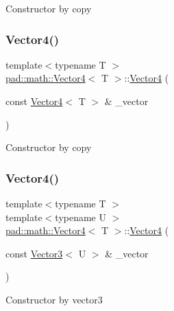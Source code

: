 Constructor by copy \mbox{\label{structpad_1_1math_1_1_vector4_a44585061b6980544187b6309a3371061}} 
\subsubsection{\texorpdfstring{Vector4()}{Vector4()}\hspace{0.1cm}{\footnotesize\ttfamily [4/7]}}
{\footnotesize\ttfamily template$<$typename T $>$ \\
\mbox{\hyperlink{structpad_1_1math_1_1_vector4}{pad\+::math\+::\+Vector4}}$<$ T $>$\+::\mbox{\hyperlink{structpad_1_1math_1_1_vector4}{Vector4}} (\begin{DoxyParamCaption}\item[{const \mbox{\hyperlink{structpad_1_1math_1_1_vector4}{Vector4}}$<$ T $>$ \&}]{\+\_\+vector }\end{DoxyParamCaption})}

Constructor by copy \mbox{\label{structpad_1_1math_1_1_vector4_a8eff662101e960939085ce8033f9ddae}} 
\subsubsection{\texorpdfstring{Vector4()}{Vector4()}\hspace{0.1cm}{\footnotesize\ttfamily [5/7]}}
{\footnotesize\ttfamily template$<$typename T $>$ \\
template$<$typename U $>$ \\
\mbox{\hyperlink{structpad_1_1math_1_1_vector4}{pad\+::math\+::\+Vector4}}$<$ T $>$\+::\mbox{\hyperlink{structpad_1_1math_1_1_vector4}{Vector4}} (\begin{DoxyParamCaption}\item[{const \mbox{\hyperlink{structpad_1_1math_1_1_vector3}{Vector3}}$<$ U $>$ \&}]{\+\_\+vector }\end{DoxyParamCaption})}

Constructor by vector3 \mbox{\label{structpad_1_1math_1_1_vector4_ab0f618c20e7b108864b231e9ff63a2ba}} 

